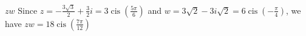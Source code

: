 { $zw$ }
{ Since $z = -\frac{3\sqrt{3}}{2} + \frac{3}{2}i = 3\operatorname{cis}\left(\frac{5\pi}{6}\right)$ and $w = 3\sqrt{2} - 3i\sqrt{2} = 6\operatorname{cis}\left(-\frac{\pi}{4}\right)$, we have $zw = 18\operatorname{cis}\left(\frac{7\pi}{12}\right)$}
